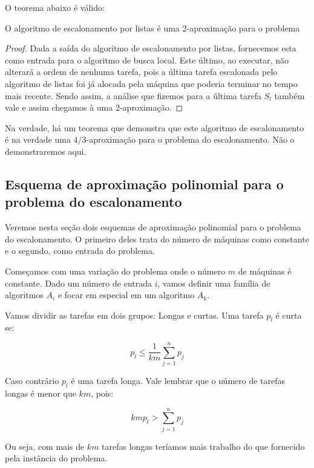 O teorema abaixo é válido:

\begin{teorema}
O algoritmo de escalonamento por listas é uma 2-aproximação para o problema
\end{teorema} 

\begin{proof}
Dada a saída do algoritmo de escalonamento por listas, fornecemos esta como entrada para o algoritmo de busca local. Este último, ao executar, não alterará a ordem de nenhuma tarefa, pois a última tarefa escalonada pelo algoritmo de listas foi já alocada pela máquina que poderia terminar no tempo mais recente. Sendo assim, a análise que fizemos para a última tarefa $S_l$ também vale e assim chegamos à uma 2-aproximação.
\end{proof}

Na verdade, há um teorema que demonstra que este algoritmo de escalonamento é na verdade uma $4/3$-aproximação para o problema do escalonamento. Não o demonstraremos aqui.

\subsection{Esquema de aproximação polinomial para o problema do escalonamento}
\label{sec:escalonamentoptas}

Veremos nesta seção dois esquemas de aproximação polinomial para o problema do escalonamento. O primeiro deles trata do número de máquinas como constante e o segundo, como entrada do problema.

Começamos com uma variação do problema onde o número $m$ de máquinas é constante. Dado um número de entrada $i$, vamos definir uma família de algoritmos $A_i$ e focar em especial em um algoritmo $A_k$.

Vamos dividir as tarefas em dois grupos: Longas e curtas. Uma tarefa $p_l$ é curta se:

\begin{equation}
p_l \leq \frac{1}{km} \sum_{j=1}^{n} p_j
\end{equation}

Caso contrário $p_l$ é uma tarefa longa. Vale lembrar que o número de tarefas longas é menor que $km$, pois:

\begin{equation}
\label{equ:kmlong}
km p_l > \sum_{j=1}^{n} p_j
\end{equation}

Ou seja, com mais de $km$ tarefas longas teríamos mais trabalho do que fornecido pela instância do problema.

